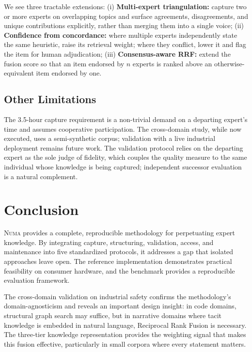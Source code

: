 \documentclass[11pt,a4paper]{article}
\begin{document}
We see three tractable extensions: (i) \textbf{Multi-expert triangulation:} capture two or more experts on overlapping topics and surface agreements, disagreements, and unique contributions explicitly, rather than merging them into a single voice; (ii) \textbf{Confidence from concordance:} where multiple experts independently state the same heuristic, raise its retrieval weight; where they conflict, lower it and flag the item for human adjudication; (iii) \textbf{Consensus-aware RRF:} extend the fusion score so that an item endorsed by $n$ experts is ranked above an otherwise-equivalent item endorsed by one.

\subsection{Other Limitations}

The 3.5-hour capture requirement is a non-trivial demand on a departing expert's time and assumes cooperative participation. The cross-domain study, while now executed, uses a semi-synthetic corpus; validation with a live industrial deployment remains future work. The validation protocol relies on the departing expert as the sole judge of fidelity, which couples the quality measure to the same individual whose knowledge is being captured; independent successor evaluation is a natural complement.

\section{Conclusion}

\textsc{Numa} provides a complete, reproducible methodology for perpetuating expert knowledge. By integrating capture, structuring, validation, access, and maintenance into five standardized protocols, it addresses a gap that isolated approaches leave open. The reference implementation demonstrates practical feasibility on consumer hardware, and the benchmark provides a reproducible evaluation framework.

The cross-domain validation on industrial safety confirms the methodology's domain-agnosticism and reveals an important design insight: in code domains, structural graph search may suffice, but in narrative domains where tacit knowledge is embedded in natural language, Reciprocal Rank Fusion is necessary. The three-tier knowledge representation provides the weighting signal that makes this fusion effective, particularly in small corpora where every statement matters.
\end{document}
